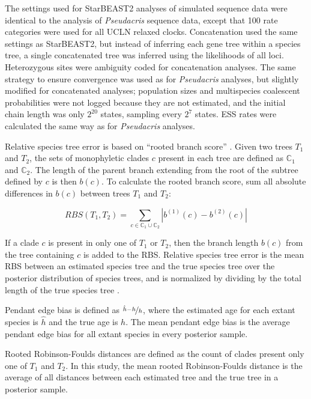 \documentclass[12pt]{article}
\begin{document}
The settings used for StarBEAST2 analyses of simulated sequence data were
identical to the analysis of \textit{Pseudacris} sequence data, except that 100
rate categories were used for all UCLN relaxed clocks. Concatenation used the
same settings as StarBEAST2, but instead of inferring each gene tree within a
species tree, a single concatenated tree was inferred using the likelihoods of
all loci. Heterozygous sites were ambiguity coded for concatenation analyses.
The same strategy to ensure convergence was used as for \textit{Pseudacris}
analyses, but slightly modified for concatenated analyses; population sizes and
multispecies coalescent probabilities were not logged because they are not
estimated, and the initial chain length was only $2^{20}$ states, sampling every
$2^{7}$ states. ESS rates were calculated the same way as for
\textit{Pseudacris} analyses.

Relative species tree error is based on ``rooted branch score''
\citep[RBS;][]{Heled2013}. Given two trees $T_1$ and $T_2$, the sets of
monophyletic clades $c$ present in each tree are defined as $\mathbb{C}_1$ and
$\mathbb{C}_2$. The length of the parent branch extending from the root of the
subtree defined by $c$ is then $b(c)$. To calculate the rooted branch score, sum
all absolute differences in $b(c)$ between trees $T_1$ and $T_2$:

\begin{equation}
RBS(T_1, T_2) = \sum_{c \in {\mathbb{C}_1} \cup {\mathbb{C}_2}} |b^{(1)}(c) - b^{(2)}(c)|
\end{equation}

If a clade $c$ is present in only one of $T_1$ or $T_2$, then the branch length
$b(c)$ from the tree containing $c$ is added to the RBS. Relative species tree
error is the mean RBS between an estimated species tree and the true
species tree over the posterior distribution of species trees, and is normalized
by dividing by the total length of the true species tree
\citep{Ogilvie01052016}.

Pendant edge bias is defined as $\nicefrac{\hat{h} - h}{h}$, where the estimated
age for each extant species is $\hat{h}$ and the true age is $h$. The mean
pendant edge bias is the average pendant edge bias for all extant species in
every posterior sample.

Rooted Robinson-Foulds distances \citep{ROBINSON1981131} are defined as the
count of clades present only one of $T_1$ and $T_2$. In this study, the mean
rooted Robinson-Foulds distance is the average of all distances between each
estimated tree and the true tree in a posterior sample.
\end{document}

